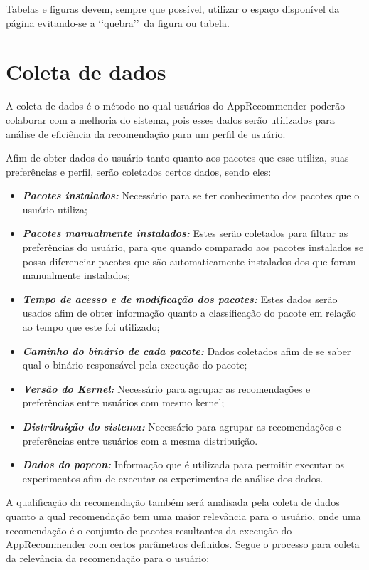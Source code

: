 Tabelas e figuras devem, sempre que possível, utilizar o espaço disponível
da página evitando-se a \lq\lq quebra\rq\rq\ da figura ou tabela.


\section{Coleta de dados}

A coleta de dados é o método no qual usuários do AppRecommender poderão
colaborar com a melhoria do sistema, pois esses dados serão utilizados para
análise de eficiência da recomendação para um perfil de usuário.

Afim de obter dados do usuário tanto quanto aos pacotes que esse utiliza,
suas preferências e perfil, serão coletados certos dados, sendo eles:

\begin{itemize}
    \item \textit{\textbf{Pacotes instalados:}} Necessário para se ter conhecimento dos pacotes que o usuário utiliza;
    \item \textit{\textbf{Pacotes manualmente instalados:}} Estes serão coletados para filtrar as preferências do usuário, para que quando comparado aos pacotes instalados se possa diferenciar pacotes que são automaticamente instalados dos que foram manualmente instalados;
    \item \textit{\textbf{Tempo de acesso e de modificação dos pacotes:}} Estes dados serão usados afim de obter informação quanto a classificação do pacote em relação ao tempo que este foi utilizado;
    \item \textit{\textbf{Caminho do binário de cada pacote:}} Dados coletados afim de se saber qual o binário responsável pela execução do pacote;
    \item \textit{\textbf{Versão do Kernel:}} Necessário para agrupar as recomendações e preferências entre usuários com mesmo kernel;
    \item \textit{\textbf{Distribuição do sistema:}} Necessário para agrupar as recomendações e preferências entre usuários com a mesma distribuição.
    \item \textit{\textbf{Dados do popcon:}} Informação que é utilizada para permitir executar os experimentos afim de executar os experimentos de análise dos dados.
\end{itemize}

A qualificação da recomendação também será analisada pela coleta de dados
quanto a qual recomendação tem uma maior relevância para o usuário, onde
uma recomendação é o conjunto de pacotes resultantes da execução do
AppRecommender com certos parâmetros definidos. Segue o processo para
coleta da relevância da recomendação para o usuário:

